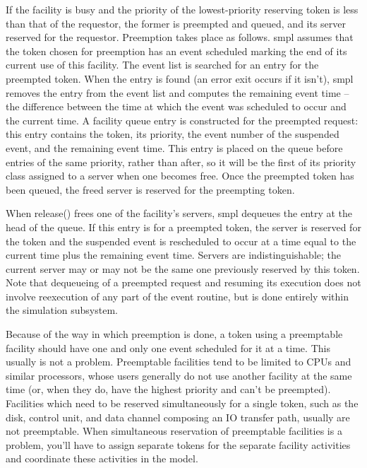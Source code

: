 If the facility is busy and the priority of the lowest-priority reserving token
is less than that of the requestor, the former is preempted and queued, and its
server reserved for the requestor. Preemption takes place as follows.
\noindent smpl assumes that the token chosen for preemption has an event scheduled marking
the end of its current use of this facility. The event list is searched for an
entry for the preempted token. When the entry is found (an error exit occurs
if it isn't), smpl removes the entry from the event list and computes the
remaining event time -- the difference between the time at which the event was
scheduled to occur and the current time. A facility queue entry is constructed
for the preempted request: this entry contains the token, its priority, the
event number of the suspended event, and the remaining event time. This entry
is placed on the queue before entries of the same priority, rather than after,
so it will be the first of its priority class assigned to a server when one
becomes free. Once the preempted token has been queued, the freed server is
reserved for the preempting token.

When release() frees one of the facility's servers, smpl dequeues the entry at
the head of the queue. If this entry is for a preempted token, the server is
reserved for the token and the suspended event is rescheduled to occur at a
time equal to the current time plus the remaining event time. Servers are
indistinguishable; the current server may or may not be the same one
previously reserved by this token. Note that dequeueing of a preempted request
and resuming its execution does not involve reexecution of any part of the
event routine, but is done entirely within the simulation subsystem.

Because of the way in which preemption is done, a token using a preemptable
facility should have one and only one event scheduled for it at a time. This
usually is not a problem. Preemptable facilities tend to be limited to CPUs
and similar processors, whose users generally do not use another facility at
the same time (or, when they do, have the highest priority and can't be
preempted). Facilities which need to be reserved simultaneously for a single
token, such as the disk, control unit, and data channel composing an IO
transfer path, usually are not preemptable. When simultaneous reservation of
preemptable facilities is a problem, you'll have to assign separate tokens for
the separate facility activities and coordinate these activities in the model.

